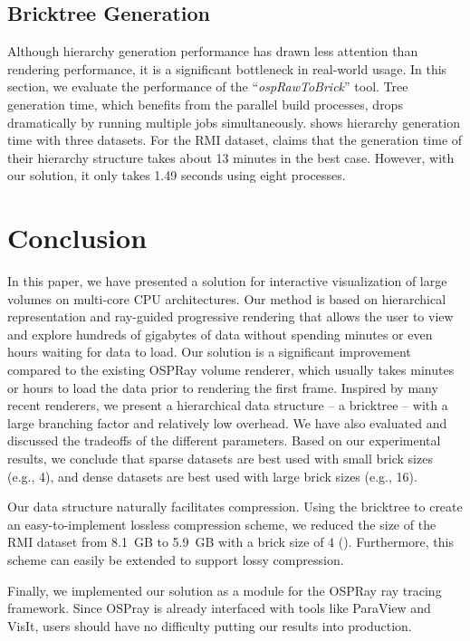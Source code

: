 \subsection{Bricktree Generation}

Although hierarchy generation performance has drawn less attention than rendering
performance, it is a significant bottleneck in real-world usage\cite{fogal2013analysis}. 
In this section, we evaluate the performance of the ``\textit{ospRawToBrick}'' tool. 
Tree generation time, which benefits from the parallel build processes, drops
dramatically by running multiple jobs simultaneously.  shows
 hierarchy generation time with three datasets. For the RMI dataset, \cite{fogal2013analysis} claims that the generation time of their hierarchy structure takes
about 13 minutes in the best case. However, with our solution, it only takes 1.49 seconds using eight processes. 



\section{Conclusion}
In this paper, we have presented a solution for interactive visualization of 
large volumes on multi-core CPU architectures. Our method is based on  
hierarchical representation and ray-guided progressive rendering that 
allows the user to view and explore hundreds of gigabytes of data without
spending minutes or even hours waiting for data to load. 
Our solution is a significant improvement compared to the existing OSPRay volume renderer,
which usually takes minutes or hours to load the data prior to rendering the first frame. 
Inspired by many recent renderers, we present a hierarchical data structure
-- a bricktree -- with a large branching factor and relatively low overhead. We have
also evaluated and discussed the tradeoffs of the different 
parameters. Based on our experimental results, we conclude that sparse datasets 
are best used with small brick sizes (e.g., 4), and dense datasets are best used with 
large brick sizes (e.g., 16). 

Our data structure naturally facilitates compression. Using the bricktree to create an easy-to-implement lossless compression scheme, we reduced the size of the RMI dataset from 8.1~GB to 5.9~GB with a brick size of 4 
(). Furthermore, this scheme can easily be extended to support lossy compression.

Finally, we implemented our solution as a module for the OSPRay ray tracing framework. Since OSPray is already interfaced with tools like ParaView and VisIt, users should have no difficulty putting our results into production.

